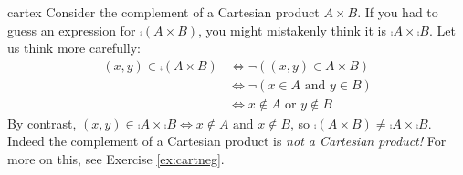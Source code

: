 \begin{examples}{}{cartex}
	 	\exstart Consider the complement of a Cartesian product $A\times B$. If you had to guess an expression for $\comp{(A\times B)}$, you might mistakenly think it is $\comp A\times\comp B$. Let us think more carefully:
		\begin{align*}
			(x,y)\in\comp{(A\times B)}
			&\iff \neg((x,y)\in A\times B) \tag{definition of complement}\\
			&\iff \neg(x\in A\text{ and }y\in B) \tag{definition of $A\times B$}\\
			&\iff x\not\in A\text{ or }y\not\in B \tag{de Morgan (logic)}
		\end{align*}
		By contrast, $(x,y)\in\comp A\times\comp B\iff x\notin A\text{ and }x\notin B$, so $\comp{(A\times B)}\neq \comp A\times\comp B$. Indeed the complement of a Cartesian product is \emph{not a Cartesian product!} For more on this, see Exercise \ref{ex:cartneg}.


\end{examples}
